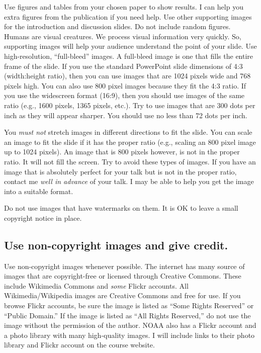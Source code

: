 \documentclass[letterpaper]{memoir}
\newcommand{\insertslide}[2]{%
  \framebox{\texttt{[image: \#2]}}
}
\begin{document}

Use figures and tables from your chosen paper to show results. I can help you extra figures from the publication if you need help. Use other supporting images for the introduction and discussion slides.
Do not include random figures. Humans are visual creatures. We process visual information very quickly. So, supporting images will help your audience understand the point of your slide.  Use high-resolution, “full-bleed” images. A full-bleed image is one that fills the entire frame of the slide.  If you use the standard PowerPoint slide dimensions of 4:3 (width:height ratio), then you can use images that are 1024 pixels wide and 768 pixels high. You can also use 800 pixel images because they fit the 4:3 ratio. If you use the widescreen format (16:9), then you should use images of the same ratio (e.g., 1600 pixels, 1365 pixels, etc.). Try to use images that are 300 dots per inch as they will appear sharper. You should use no less than 72 dots per inch.

You \emph{must not} stretch images in different directions to fit the slide. You can scale an image to fit the slide if it has the proper ratio (e.g., scaling an 800 pixel image up to 1024 pixels). An image that is 800 pixels however, is not in the proper ratio. It will not fill the screen.  Try to avoid these types of images.  If you have an image that is absolutely perfect for your talk but is not in the proper ratio, contact me \emph{well in advance} of your talk. I may be able to help you get the image into a suitable format.

Do not use images that have watermarks on them. It is OK to leave a small copyright notice in place.  

\subsection*{Use non-copyright images and give credit.}

\sidepar{\insertslide{15}{5_in_5_overview.pdf}}
Use non-copyright images whenever possible. The internet has many source of images that are copyright-free or licensed through Creative Commons. These include Wikimedia Commons and \emph{some} Flickr accounts. All Wikimedia/Wikipedia images are Creative Commons and free for use. If you browse Flickr accounts, be sure the image is listed as “Some Rights Reserved” or ``Public Domain.'' If the image is listed as “All Rights Reserved,” do not use the image without the permission of the author. NOAA also has a Flickr account and a photo library with many high-quality images. I will include links to their photo library and Flickr account on the course website.
\end{document}

